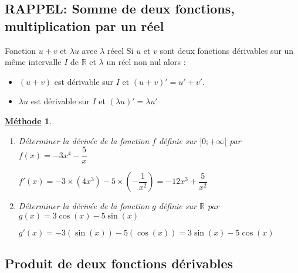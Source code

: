 \documentclass[11pt,a4paper]{article}
\def\R{{\mathbb R}}
\theoremstyle{break}
\newtheorem{Meth}{\underline{Méthode}}
\begin{document}
	\subsection{RAPPEL: Somme de deux fonctions, multiplication par un réel}
\begin{bclogo}[couleur = yellow!30, arrondi = 0.1,logo=\bcbook]{Fonction $u+v$ et $\lambda u$ avec $\lambda$ réeel}
	Si $u$ et $v$ sont deux fonctions dérivables sur un même intervalle $I$ de $\R$ et $\lambda$ un réel non nul alors :
	\begin{itemize}
		\item $(u+v)$ est dérivable sur $I$ et $(u+v)'=u'+v'$.
		\item $\lambda u$ est dérivable sur  $I$ et $(\lambda u)'= \lambda u'$
	\end{itemize} 
\end{bclogo}




\begin{Meth}
	\begin{enumerate}
		\item Déterminer la dérivée de la fonction $f$ définie sur $]0;+\infty[$ par $f(x)=-3x^4-\dfrac5x$\par
		$f'(x) = -3 \times (4x^3) -5 \times	(-\dfrac{1}{x^2}) = -12x^3 + \dfrac{5}{x^2}$
		\item Déterminer la dérivée de la fonction $g$ définie sur $\R$ par $g(x)=3\cos(x)-5\sin(x)$\par
		$g'(x) = -3 (\sin(x)) -5 (\cos(x)) = 3\sin(x) - 5\cos(x)$
	\end{enumerate}
	
\end{Meth} 
\newpage
\subsection{Produit de deux fonctions dérivables}
\end{document}
